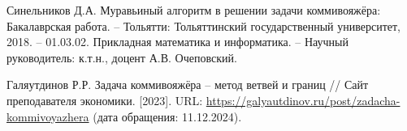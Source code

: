 
\renewcommand{\refname}{\begin{center}\MakeUppercase{Список использованных источников}\end{center}}

\begin{thebibliography}{9}
  
    Синельников Д.А. Муравьиный алгоритм в решении задачи коммивояжёра: Бакалаврская работа. -- Тольятти: Тольяттинский государственный университет, 2018. -- 01.03.02. Прикладная математика и информатика. -- Научный руководитель: к.т.н., доцент А.В. Очеповский.  
    
    Галяутдинов Р.Р. Задача коммивояжёра -- метод ветвей и границ // Сайт преподавателя экономики. [2023]. URL: \url{https://galyautdinov.ru/post/zadacha-kommivoyazhera} (дата обращения: 11.12.2024).
  
\end{thebibliography}